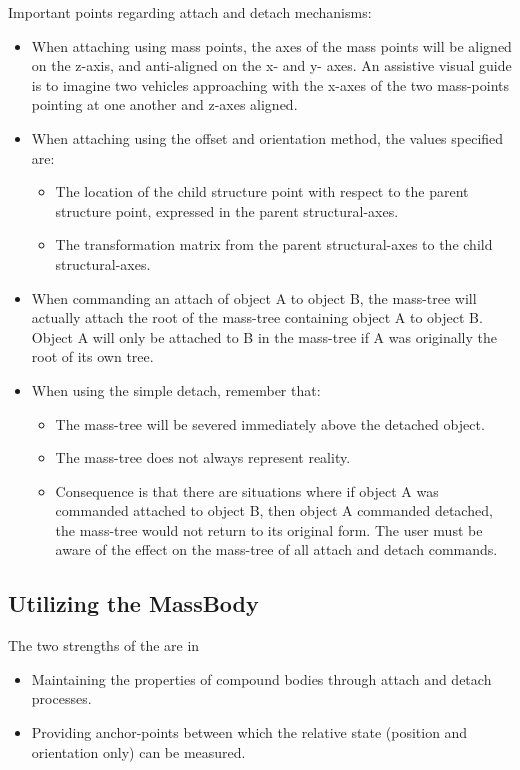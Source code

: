 Important points regarding attach and detach mechanisms:
\begin{itemize}
 \item When attaching using mass points, the axes of the mass points will be 
 aligned on the z-axis, and anti-aligned on the x- and y- axes.  An assistive 
 visual guide is to imagine two vehicles approaching with the x-axes of the 
 two mass-points pointing at one another and z-axes aligned.
 \item When attaching using the offset and orientation method, the values 
 specified are:
 \begin{itemize}
  \item The location of the child structure point with respect to the parent 
  structure point, expressed in the parent structural-axes.
  \item The transformation matrix from the parent structural-axes to the child 
  structural-axes.
 \end{itemize}
 \item When commanding an attach of object A to object B, the mass-tree will 
 actually attach the root of the mass-tree containing object A to object B.
 Object A will only be attached to B in the mass-tree if A was originally the 
 root of its own tree.
 \item When using the simple detach, remember that:
 \begin{itemize}
  \item The mass-tree will be severed immediately above the detached object.
  \item The mass-tree does not always represent reality.
  \item Consequence is that there are situations where if object A was 
  commanded attached to object B, then object A commanded detached, the 
  mass-tree would not return to its original form.  The user must be aware of 
  the effect on the mass-tree of all attach and detach commands.
 \end{itemize}
\end{itemize}


\subsection{Utilizing the MassBody}
The two strengths of the \ModelDesc are in 
\begin{itemize}
 \item Maintaining the properties of compound bodies through attach and detach 
 processes.
 \item Providing anchor-points between which the relative state (position and 
 orientation only) can be measured.
\end{itemize}


